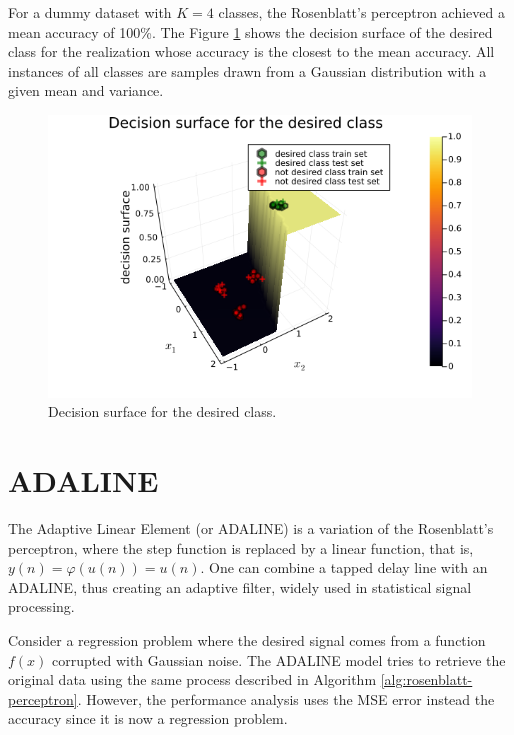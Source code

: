 \documentclass[12pt,a4paper]{article}
\begin{document}
For a dummy dataset with \(K=4\) classes, the Rosenblatt's perceptron achieved a mean accuracy of 100\%. The Figure \ref{fig:decision-surface-dummy-data} shows the decision surface of the desired class for the realization whose accuracy is the closest to the mean accuracy. All instances of all classes are samples drawn from a Gaussian distribution with a given mean and variance.

\begin{figure}[H]
    \centering
    \includegraphics[scale=0.35]{../trab1 (single perceptron)/figs/decision-surface-for-dummy-data.png}
    \caption{Decision surface for the desired class.}
    \label{fig:decision-surface-dummy-data}
\end{figure}

\section{ADALINE}

The Adaptive Linear Element (or ADALINE) is a variation of the Rosenblatt's perceptron, where the step function is replaced by a linear function, that is, \(y(n) = \varphi(u(n)) = u(n)\). One can combine a tapped delay line with an ADALINE, thus creating an adaptive filter, widely used in statistical signal processing.

Consider a regression problem where the desired signal comes from a function \(f(x)\) corrupted with Gaussian noise. The ADALINE model tries to retrieve the original data using the same process described in Algorithm \ref{alg:rosenblatt-perceptron}. However, the performance analysis uses the MSE error instead the accuracy since it is now a regression problem.
\end{document}
